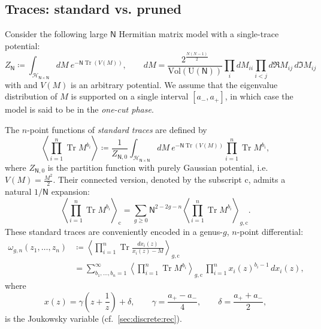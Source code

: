 \documentclass[a4paper,11pt,english]{article}
\theoremstyle{plain}
\theoremstyle{definition}
\theoremstyle{plain}
\newcommand{\cc}{\mathrm{c}}
\DeclareMathOperator{\Tr}{Tr}
\newcommand{\ms}[1]{\mathsf{#1}}
\begin{document}
\subsection{Traces: standard vs. pruned}
Consider the following large $\ms{N}$ Hermitian matrix model with a single-trace potential:
\begin{equation} \label{eq:MM}
    Z_{\ms{N}}
    \coloneqq
    \int_{\mathcal{H}_{\ms{N} \times \ms{N}}} dM \ e^{-\ms{N} \Tr(V(M))},
    \qquad
    dM = \frac{2^{\frac{N(N-1)}{2}}}{\mathrm{Vol}( \mathrm{U}(\ms{N}))}
    \prod_i dM_{ii} \prod_{i<j} d\Re M_{ij}\, d\Im M_{ij}
\end{equation}
with \smash{$\mathrm{Vol}(\mathrm{U}(\ms{N})) = (2\pi)^{\frac{N(N+1)}{2}}/\prod_{k=1}^{N-1}k!$} and $V(M)$ is an arbitrary potential. We assume that the eigenvalue distribution of $M$ is supported on a single interval $[a_-, a_+]$, in which case the model is said to be in the \emph{one-cut phase}.

The $n$-point functions of \emph{standard traces} are defined by
\begin{equation}
    \left\langle \prod_{i=1}^n \Tr{M^{b_i}} \right\rangle
    \coloneqq
    \frac{1}{Z_{\ms{N},0}}
    \int_{\mathcal{H}_{\ms{N} \times \ms{N}}}
        dM \ e^{-\ms{N} \Tr(V(M))} \prod_{i=1}^n \Tr{M^{b_i}},
\end{equation}
where $Z_{\ms{N},0}$ is the partition function with purely Gaussian potential, i.e. $V(M) = \frac{M^2}{2}$. Their connected version, denoted by the subscript $\cc$, admits a natural $1/\ms{N}$ expansion:
\begin{equation}
     \left\langle \prod_{i=1}^n \Tr{M^{b_i}} \right\rangle_{\!\!\cc}
     =
     \sum_{g \ge 0} \ms{N}^{2-2g-n}
     \left\langle \prod_{i=1}^n \Tr{M^{b_i}} \right\rangle_{\!\!g,\cc}.
\end{equation}
These standard traces are conveniently encoded in a genus-$g$, $n$-point differential:
\begin{equation}\label{eq:Wgn}
\begin{split}
    \omega_{g,n}(z_1,\ldots,z_n)
    &\coloneqq
    \left\langle \prod_{i=1}^n \Tr{ \frac{dx_i(z)}{x_i(z) - M} } \right\rangle_{\!\!g,\cc} \\
    &=
    \sum_{b_{1},\ldots,b_n = 1}^{\infty}
        \left\langle \prod_{i=1}^n \Tr{M^{b_i}} \right\rangle_{\!\!g,\cc} \,
        \prod_{i=1}^n x_i(z)^{b_i-1} \, dx_{i}(z),
\end{split}
\end{equation}
where
\begin{equation}\label{eq:Joukowsky}
    x(z) = \gamma \left(z + \frac{1}{z}\right) + \delta,
    \qquad
    \gamma = \frac{a_+ - a_-}{4},
    \qquad
    \delta = \frac{a_+ + a_-}{2},
\end{equation}
is the Joukowsky variable (cf.~\cref{sec:discrete:rec}).
\end{document}
